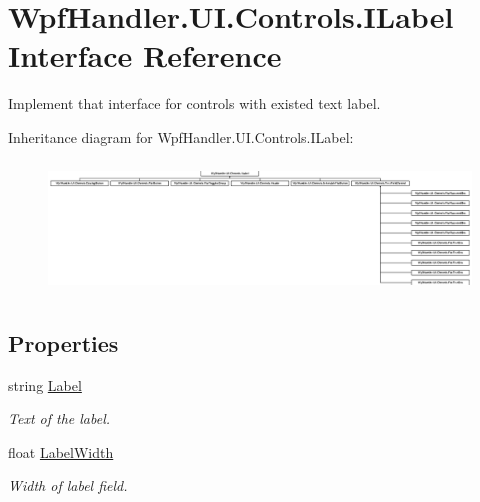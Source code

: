 \hypertarget{interface_wpf_handler_1_1_u_i_1_1_controls_1_1_i_label}{}\section{Wpf\+Handler.\+U\+I.\+Controls.\+I\+Label Interface Reference}
\label{interface_wpf_handler_1_1_u_i_1_1_controls_1_1_i_label}


Implement that interface for controls with existed text label.  


Inheritance diagram for Wpf\+Handler.\+U\+I.\+Controls.\+I\+Label\+:\begin{figure}[H]
\begin{center}
\leavevmode
\includegraphics[height=3.529412cm]{dd/de2/interface_wpf_handler_1_1_u_i_1_1_controls_1_1_i_label}
\end{center}
\end{figure}
\subsection*{Properties}
\begin{DoxyCompactItemize}
\item 
string \mbox{\hyperlink{interface_wpf_handler_1_1_u_i_1_1_controls_1_1_i_label_aebbb23ec8dfeb78718107bc877f39c98}{Label}}
\begin{DoxyCompactList}\small\item\em Text of the label. \end{DoxyCompactList}\item 
float \mbox{\hyperlink{interface_wpf_handler_1_1_u_i_1_1_controls_1_1_i_label_a20f588e0463f8b77531f342415f2eaa4}{Label\+Width}}
\begin{DoxyCompactList}\small\item\em Width of label field. \end{DoxyCompactList}\end{DoxyCompactItemize}


